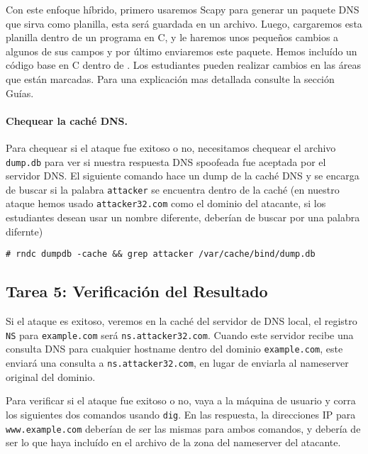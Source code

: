 Con este enfoque híbrido, primero usaremos Scapy para generar un paquete DNS que sirva como planilla, esta será guardada en un archivo.
Luego, cargaremos esta planilla dentro de un programa en C, y le haremos unos pequeños cambios a algunos de sus campos y por último enviaremos este paquete.
Hemos incluído un código base en C dentro de  . 
Los estudiantes pueden realizar cambios en las áreas que están marcadas. Para una explicación mas detallada consulte la sección Guías.



\paragraph{Chequear la caché DNS.}
Para chequear si el ataque fue exitoso o no, necesitamos chequear el archivo  {\tt dump.db} para ver si nuestra respuesta DNS spoofeada fue aceptada por el servidor DNS.
El siguiente comando hace un dump de la caché DNS y se encarga de buscar si la palabra \texttt{attacker} se encuentra dentro de la caché (en nuestro ataque hemos usado \texttt{attacker32.com} como el dominio del atacante, si los estudiantes desean usar un nombre diferente, deberían de buscar por una palabra difernte)

\begin{lstlisting}
# rndc dumpdb -cache && grep attacker /var/cache/bind/dump.db
\end{lstlisting}
 

\subsection{Tarea 5: Verificación del Resultado}

Si el ataque es exitoso, veremos en la caché del servidor de DNS local, el registro {\tt NS} para \texttt{example.com} será \texttt{ns.attacker32.com}.
Cuando este servidor recibe una consulta DNS para cualquier hostname dentro del dominio \texttt{example.com}, este enviará una consulta a \texttt{ns.attacker32.com}, en lugar de enviarla al nameserver original del dominio.

Para verificar si el ataque fue exitoso o no, vaya a la máquina de usuario y corra los siguientes dos comandos usando \texttt{dig}. En las respuesta, la direcciones IP para \texttt{www.example.com} deberían de ser las mismas para ambos comandos, y debería de ser lo que haya incluído en el archivo de la zona del nameserver del atacante.

